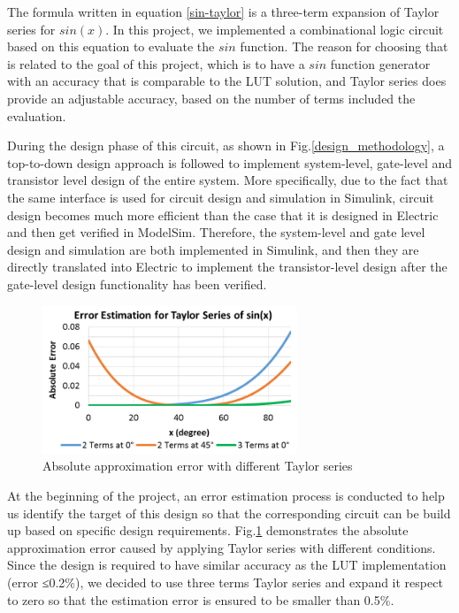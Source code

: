 \documentclass[10pt,journal]{IEEEtran}
\begin{document}
The formula written in equation \ref{sin-taylor} is a three-term expansion of Taylor series for $sin(x)$. In this project, we implemented a combinational logic circuit based on this equation to evaluate the $sin$ function. The reason for choosing that is related to the goal of this project, which is to have a $sin$ function generator with an accuracy that is comparable to the LUT solution, and Taylor series does provide an adjustable accuracy, based on the number of terms included the evaluation.

During the design phase of this circuit, as shown in Fig.\ref{design_methodology}, a top-to-down design approach is followed to implement system-level, gate-level and transistor level design of the entire system. More specifically, due to the fact that the same interface is used for circuit design and simulation in Simulink, circuit design becomes much more efficient than the case that it is designed in Electric and then get verified in ModelSim. Therefore, the system-level and gate level design and simulation are both implemented in Simulink, and then they are directly translated into Electric to implement the transistor-level design after the gate-level design functionality has been verified. 

\begin{figure}[h]
\centering
\includegraphics[width=3in]{error-estimation.png}
\caption{Absolute approximation error with different Taylor series}
\label{error-estimation}
\end{figure}

At the beginning of the project, an error estimation process is conducted to help us identify the target of this design so that the corresponding circuit can be build up based on specific design requirements. Fig.\ref{error-estimation} demonstrates the absolute approximation error caused by applying Taylor series with different conditions. Since the design is required to have similar accuracy as the LUT implementation (error ≤0.2\%), we decided to use three terms Taylor series and expand it respect to zero so that the estimation error is ensured to be smaller than 0.5\%.
\end{document}
